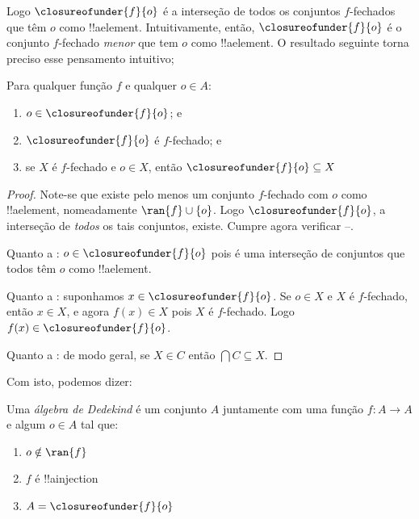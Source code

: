 \documentclass[../../../include/open-logic-section]{subfiles}
\begin{document}
Logo $\closureofunder{f}{o}$ é a interseção de todos os conjuntos
$f$-fechados que têm $o$ como !!a{element}. Intuitivamente, então,
$\closureofunder{f}{o}$ é o conjunto $f$-fechado \emph{menor} que tem $o$
como !!a{element}. O resultado seguinte torna preciso esse pensamento intuitivo;
\begin{lem}
	Para qualquer função $f$ e qualquer $o \in A$:
	\begin{enumerate}
		\item{} $o \in \closureofunder{f}{o}$; e
		\item{} $\closureofunder{f}{o}$ é $f$-fechado; e
		\item{} se $X$ é $f$-fechado e $o \in
		X$, então $\closureofunder{f}{o} \subseteq X$
	\end{enumerate}
\end{lem}

\begin{proof}
Note-se que existe pelo menos um conjunto $f$-fechado com $o$ como !!a{element}, nomeadamente $\ran{f}\cup
\{o\}$. Logo $\closureofunder{f}{o}$, a interseção de \emph{todos} os
tais conjuntos, existe. Cumpre agora verificar
--.

Quanto a : $o \in \closureofunder{f}{o}$ pois é uma
interseção de conjuntos que todos têm $o$ como !!a{element}.

Quanto a : suponhamos $x \in \closureofunder{f}{o}$. Se $o \in X$ e $X$ é $f$-fechado, então $x \in X$, e agora $f(x) \in X$ pois $X$ é
$f$-fechado. Logo $f(x) \in \closureofunder{f}{o}$.

Quanto a : de modo geral, se $X
\in C$ então $\bigcap C \subseteq X$.
\end{proof}

Com isto, podemos dizer:

\begin{defn}
Uma \emph{álgebra de Dedekind} é um conjunto $A$ juntamente com uma função $f
\colon A \to A$ e algum $o \in A$ tal que:
	\begin{enumerate}
		\item {} $o \notin \ran{f}$
		\item {} $f$ é !!a{injection}
		\item {} $A = \closureofunder{f}{o}$
	\end{enumerate}
\end{defn}
\end{document}

